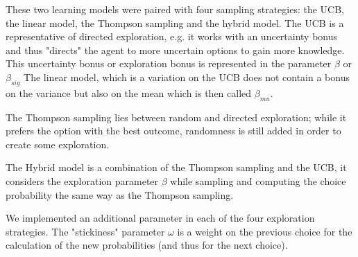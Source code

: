 These two learning models were paired with four sampling strategies: the UCB, the linear model, the Thompson sampling and the hybrid model.
The UCB is a representative of directed exploration, e.g. it works with an uncertainty bonus and thus "directs" the agent to more uncertain options to gain more knowledge. This uncertainty bonus or exploration bonus is represented in the parameter $\beta$ or $\beta_{sig}$
The linear model, which is a variation on the UCB does not contain a bonus on the variance but also on the mean which is then called $\beta_{mu}$.

The Thompson sampling lies between random and directed exploration; while it prefers the option with the best outcome, randomness is still added in order to create some exploration. 

The Hybrid model is a combination of the Thompson sampling and the UCB, it considers the exploration parameter $\beta$ while sampling and computing the choice probability the same way as the Thompson sampling. 

We implemented an additional parameter in each of the four exploration strategies\citep{gershman2009human}. The "stickiness" parameter $\omega$ is a weight on the previous choice for the calculation of the new probabilities (and thus for the next choice).


